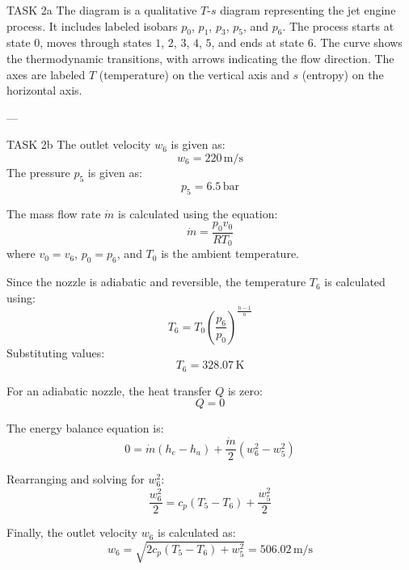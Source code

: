 TASK 2a  
The diagram is a qualitative \( T \)-\( s \) diagram representing the jet engine process. It includes labeled isobars \( p_0 \), \( p_1 \), \( p_3 \), \( p_5 \), and \( p_6 \). The process starts at state \( 0 \), moves through states \( 1 \), \( 2 \), \( 3 \), \( 4 \), \( 5 \), and ends at state \( 6 \). The curve shows the thermodynamic transitions, with arrows indicating the flow direction. The axes are labeled \( T \) (temperature) on the vertical axis and \( s \) (entropy) on the horizontal axis.

---

TASK 2b  
The outlet velocity \( w_6 \) is given as:  
\[
w_6 = 220 \, \text{m/s}
\]  
The pressure \( p_5 \) is given as:  
\[
p_5 = 6.5 \, \text{bar}
\]  

The mass flow rate \( \dot{m} \) is calculated using the equation:  
\[
\dot{m} = \frac{p_0 v_0}{R T_0}
\]  
where \( v_0 = v_6 \), \( p_0 = p_6 \), and \( T_0 \) is the ambient temperature.  

Since the nozzle is adiabatic and reversible, the temperature \( T_6 \) is calculated using:  
\[
T_6 = T_0 \left( \frac{p_6}{p_0} \right)^{\frac{n-1}{n}}
\]  
Substituting values:  
\[
T_6 = 328.07 \, \text{K}
\]  

For an adiabatic nozzle, the heat transfer \( Q \) is zero:  
\[
Q = 0
\]  

The energy balance equation is:  
\[
0 = \dot{m} (h_e - h_a) + \frac{\dot{m}}{2} (w_6^2 - w_5^2)
\]  

Rearranging and solving for \( w_6^2 \):  
\[
\frac{w_6^2}{2} = c_p (T_5 - T_6) + \frac{w_5^2}{2}
\]  

Finally, the outlet velocity \( w_6 \) is calculated as:  
\[
w_6 = \sqrt{2 c_p (T_5 - T_6) + w_5^2} = 506.02 \, \text{m/s}
\]